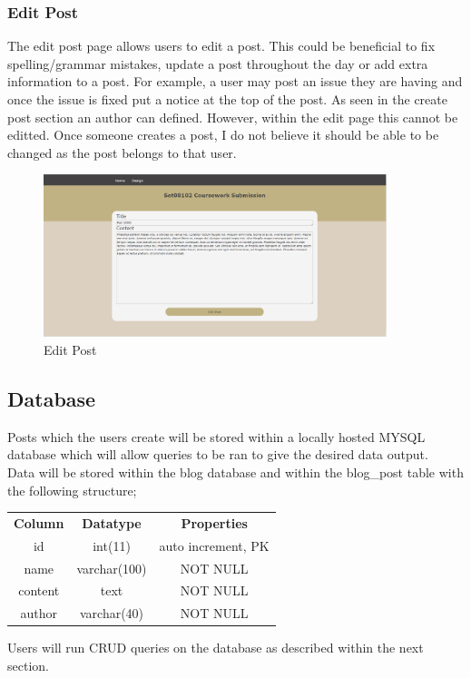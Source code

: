 \documentclass[10pt, a4paper]{article}
\begin{document}
\subsubsection{Edit Post}
The edit post page allows users to edit a post.  This could be beneficial to fix spelling/grammar mistakes, update a post throughout the day or add extra information to a post.  For example, a user may post an issue they are having and once the issue is fixed put a notice at the top of the post. As seen in the create post section an author can defined.  However, within the edit page this cannot be editted. Once someone creates a post, I do not believe it should be able to be changed as the post belongs to that user. 
\begin{figure}[H]
  	  \centering
   	 \includegraphics[width=100mm]{images/edit.png}
    	\caption{Edit Post}
 \end{figure} 

\subsection{Database}
Posts which the users create will be stored within a locally hosted MYSQL database which will allow queries to be ran to give the desired data output. \\

Data will be stored within the blog database and within the blog\_post table with the following structure;\\

\begin{center}
\begin{tabular}{c c c}
\textbf{Column} & \textbf{Datatype} & \textbf{Properties} \\
id & int(11) & auto increment,  PK\\
name & varchar(100) & NOT NULL \\
content & text & NOT NULL \\
author & varchar(40) & NOT NULL\\
\end{tabular}
\end{center}
Users will run CRUD queries on the database as described within the next section.
\end{document}

